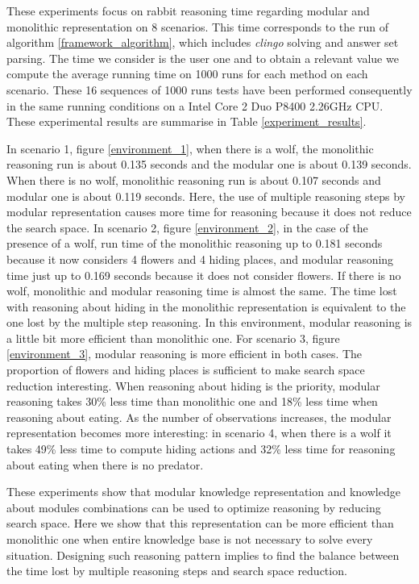 \documentclass{aamas2012}
\begin{document}
	These experiments focus on rabbit reasoning time regarding modular and monolithic representation on 8 scenarios.
	This time corresponds to the run of algorithm \ref{framework_algorithm}, which includes \emph{clingo} solving and answer set parsing.
	The time we consider is the user one and to obtain a relevant value we compute the average running time on 1000 runs for each method on each scenario.
	These 16 sequences of 1000 runs tests have been performed consequently in the same running conditions on a Intel Core 2 Duo P8400 2.26GHz CPU.
	These experimental results are summarise in Table \ref{experiment_results}.
	
	In scenario 1, figure \ref{environment_1}, when there is a wolf, the monolithic reasoning run is about 0.135 seconds and the modular one is about 0.139 seconds.
	When there is no wolf, monolithic reasoning run is about 0.107 seconds and modular one is about 0.119 seconds.
	Here, the use of multiple reasoning steps by modular representation causes more time for reasoning because it does not reduce the search space.
	In scenario 2, figure \ref{environment_2}, in the case of the presence of a wolf, 
	run time of the monolithic reasoning up to 0.181 seconds because it now considers 4 flowers and 4 hiding places,
	and modular reasoning time just up to 0.169 seconds because it does not consider flowers.
	If there is no wolf, monolithic and modular reasoning time is almost the same.
	The time lost with reasoning about hiding in the monolithic representation is equivalent to the one lost by the multiple step reasoning.
	In this environment, modular reasoning is a little bit more efficient than monolithic one.
	For scenario 3, figure \ref{environment_3}, modular reasoning is more efficient in both cases.
	The proportion of flowers and hiding places is sufficient to make search space reduction interesting.
	When reasoning about hiding is the priority, modular reasoning takes 30\% less time than monolithic one and
	18\% less time when reasoning about eating.
	As the number of observations increases, the modular representation becomes more interesting: in scenario 4, when there is a wolf it takes 49\% less time to
	compute hiding actions and 32\% less time for reasoning about eating when there is no predator.
	
	These experiments show that modular knowledge representation and knowledge about modules combinations can be used to optimize reasoning by reducing search space.
	Here we show that this representation can be more efficient than monolithic one when entire knowledge base is not necessary to solve every situation.
	Designing such reasoning pattern implies to find the balance between the time lost by multiple reasoning steps and search space reduction.
	
\end{document}
